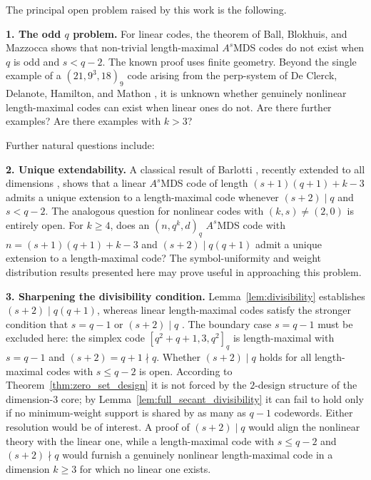 \documentclass[12pt, letterpaper]{article}
\theoremstyle{plain}
\theoremstyle{definition}
\begin{document}
	The principal open problem raised by this work is the following.

	\medskip
	
	\noindent\textbf{1. The odd $q$ problem.} 
	For linear codes, the theorem of Ball, Blokhuis, and Mazzocca \cite{Ball1997MaximalArcs} shows that non-trivial length-maximal $A^s$MDS codes do not exist when $q$ is odd and $s<q-2$. The known proof uses finite geometry. Beyond the single example of a $(21,9^3,18)_9$ code arising from the perp-system of De Clerck, Delanote, Hamilton, and Mathon \cite{DeClerck2002PerpSystems}, it is unknown whether genuinely nonlinear length-maximal codes can exist when linear ones do not. Are there further examples? Are there examples with $k>3$?
		\medskip
	
	Further natural questions include:
	\medskip

	\noindent\textbf{2. Unique extendability.}
	A classical result of Barlotti \cite{Barlotti1956}, recently extended to all dimensions \cite{alderson2025projectivesystems}, shows that a linear $A^s$MDS code of length $(s+1)(q+1)+k-3$ admits a unique extension to a length-maximal code whenever $(s+2) \mid q$ and $s < q-2$. The analogous question for nonlinear codes with $(k,s)\ne (2,0)$ is entirely open. For  $k\ge 4$, does an $(n, q^k, d)_q$ $A^s$MDS code with $n = (s+1)(q+1)+k - 3$ and $(s+2) \mid q(q+1)$ admit a unique extension to a length-maximal code? The symbol-uniformity and weight distribution results presented here may prove useful in approaching this problem.

	\medskip
	
	\noindent\textbf{3. Sharpening the divisibility condition.}
	Lemma~\ref{lem:divisibility} establishes $(s+2) \mid q(q+1)$, whereas linear length-maximal codes satisfy the stronger condition that $s = q-1$ or $(s+2) \mid q$ \cite{Ball1997MaximalArcs, alderson2025projectivesystems}. The boundary case $s=q-1$ must be excluded here: the simplex code $[q^2+q+1,3,q^2]_q$ is length-maximal with $s = q-1$ and $(s+2) = q+1 \nmid q$. Whether $(s+2) \mid q$ holds for all length-maximal codes with $s \le q-2$ is open. According to Theorem~\ref{thm:zero_set_design} it is not forced by the $2$-design structure of the dimension-$3$ core; by Lemma~\ref{lem:full_secant_divisibility} it can fail to hold only if no minimum-weight support is shared by as many as $q-1$ codewords. Either resolution would be of interest.  A proof of $(s+2) \mid q$ would align the nonlinear theory with the linear one, while a length-maximal code with $s \le q-2$ and $(s+2) \nmid q$ would furnish a genuinely nonlinear length-maximal code in a dimension $k \ge 3$ for which no linear one exists.
\end{document}
